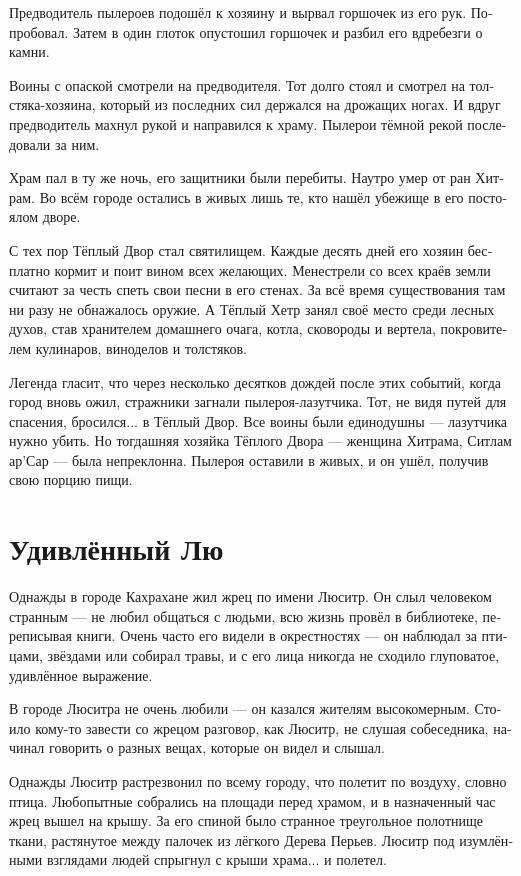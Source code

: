 \documentclass[a4paper,12pt,fleqn]{book}\usepackage{polyglossia}\setdefaultlanguage[babelshorthands=true]{russian}\setotherlanguage{english}\defaultfontfeatures{Ligatures=TeX,Mapping=tex-text}\usepackage{xcolor}\newcommand{\ml}[3]{#2}
\begin{document}
{Предводитель пылероев подошёл к хозяину и вырвал горшочек из его рук.
Попробовал.
Затем в один глоток опустошил горшочек и разбил его вдребезги о камни.

Воины с опаской смотрели на предводителя.
Тот долго стоял и смотрел на толстяка-хозяина, который из последних сил держался на дрожащих ногах.
И вдруг предводитель махнул рукой и направился к храму.
Пылерои тёмной рекой последовали за ним.

Храм пал в ту же ночь, его защитники были перебиты.
Наутро умер от ран Хитрам.
Во всём городе остались в живых лишь те, кто нашёл убежище в его постоялом дворе.

С тех пор Тёплый Двор стал святилищем.
Каждые десять дней его хозяин бесплатно кормит и поит вином всех желающих.
Менестрели со всех краёв земли считают за честь спеть свои песни в его стенах.
За всё время существования там ни разу не обнажалось оружие.
А Тёплый Хетр занял своё место среди лесных духов, став хранителем домашнего очага, котла, сковороды и вертела, покровителем кулинаров, виноделов и толстяков.

Легенда гласит, что через несколько десятков дождей после этих событий, когда город вновь ожил, стражники загнали пылероя-лазутчика.
Тот, не видя путей для спасения, бросился... в Тёплый Двор.
Все воины были единодушны --- лазутчика нужно убить. Но тогдашняя хозяйка Тёплого Двора --- женщина Хитрама, Ситлам ар’Сар --- была непреклонна.
Пылероя оставили в живых, и он ушёл, получив свою порцию пищи.

\section{Удивлённый Лю}

Однажды в городе Кахрахане жил жрец по имени Люситр.
Он слыл человеком странным --- не любил общаться с людьми, всю жизнь провёл в библиотеке, переписывая книги.
Очень часто его видели в окрестностях --- он наблюдал за птицами, звёздами или собирал травы, и с его лица никогда не сходило глуповатое, удивлённое выражение.

В городе Люситра не очень любили --- он казался жителям высокомерным.
Стоило кому-то завести со жрецом разговор, как Люситр, не слушая собеседника, начинал говорить о разных вещах, которые он видел и слышал.

Однажды Люситр растрезвонил по всему городу, что полетит по воздуху, словно птица.
Любопытные собрались на площади перед храмом, и в назначенный час жрец вышел на крышу.
За его спиной было странное треугольное полотнище ткани, растянутое между палочек из лёгкого Дерева Перьев.
Люситр под изумлёнными взглядами людей спрыгнул с крыши храма... и полетел.

}
\end{document}
